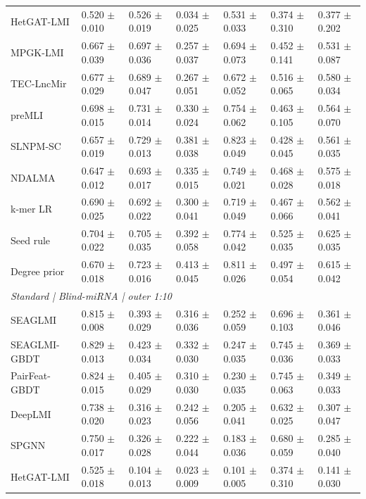 \begin{landscape}
{\begin{longtable}{lllllll}
HetGAT-LMI & 0.520 $\pm$ 0.010 & 0.526 $\pm$ 0.019 & 0.034 $\pm$ 0.025 & 0.531 $\pm$ 0.033 & 0.374 $\pm$ 0.310 & 0.377 $\pm$ 0.202 \\
MPGK-LMI & 0.667 $\pm$ 0.039 & 0.697 $\pm$ 0.036 & 0.257 $\pm$ 0.037 & 0.694 $\pm$ 0.073 & 0.452 $\pm$ 0.141 & 0.531 $\pm$ 0.087 \\
TEC-LncMir & 0.677 $\pm$ 0.029 & 0.689 $\pm$ 0.047 & 0.267 $\pm$ 0.051 & 0.672 $\pm$ 0.052 & 0.516 $\pm$ 0.065 & 0.580 $\pm$ 0.034 \\
preMLI & 0.698 $\pm$ 0.015 & 0.731 $\pm$ 0.014 & 0.330 $\pm$ 0.024 & 0.754 $\pm$ 0.062 & 0.463 $\pm$ 0.105 & 0.564 $\pm$ 0.070 \\
SLNPM-SC & 0.657 $\pm$ 0.019 & 0.729 $\pm$ 0.013 & 0.381 $\pm$ 0.038 & 0.823 $\pm$ 0.049 & 0.428 $\pm$ 0.045 & 0.561 $\pm$ 0.035 \\
NDALMA & 0.647 $\pm$ 0.012 & 0.693 $\pm$ 0.017 & 0.335 $\pm$ 0.015 & 0.749 $\pm$ 0.021 & 0.468 $\pm$ 0.028 & 0.575 $\pm$ 0.018 \\
k-mer LR & 0.690 $\pm$ 0.025 & 0.692 $\pm$ 0.022 & 0.300 $\pm$ 0.041 & 0.719 $\pm$ 0.049 & 0.467 $\pm$ 0.066 & 0.562 $\pm$ 0.041 \\
Seed rule & 0.704 $\pm$ 0.022 & 0.705 $\pm$ 0.035 & 0.392 $\pm$ 0.058 & 0.774 $\pm$ 0.042 & 0.525 $\pm$ 0.035 & 0.625 $\pm$ 0.035 \\
Degree prior & 0.670 $\pm$ 0.018 & 0.723 $\pm$ 0.016 & 0.413 $\pm$ 0.045 & 0.811 $\pm$ 0.026 & 0.497 $\pm$ 0.054 & 0.615 $\pm$ 0.042 \\
\multicolumn{7}{l}{\textit{Standard | Blind-miRNA | outer 1:10}}\\
SEAGLMI & 0.815 $\pm$ 0.008 & 0.393 $\pm$ 0.029 & 0.316 $\pm$ 0.036 & 0.252 $\pm$ 0.059 & 0.696 $\pm$ 0.103 & 0.361 $\pm$ 0.046 \\
SEAGLMI-GBDT & 0.829 $\pm$ 0.013 & 0.423 $\pm$ 0.034 & 0.332 $\pm$ 0.030 & 0.247 $\pm$ 0.035 & 0.745 $\pm$ 0.036 & 0.369 $\pm$ 0.033 \\
PairFeat-GBDT & 0.824 $\pm$ 0.015 & 0.405 $\pm$ 0.029 & 0.310 $\pm$ 0.030 & 0.230 $\pm$ 0.035 & 0.745 $\pm$ 0.063 & 0.349 $\pm$ 0.033 \\
DeepLMI & 0.738 $\pm$ 0.020 & 0.316 $\pm$ 0.023 & 0.242 $\pm$ 0.056 & 0.205 $\pm$ 0.041 & 0.632 $\pm$ 0.025 & 0.307 $\pm$ 0.047 \\
SPGNN & 0.750 $\pm$ 0.017 & 0.326 $\pm$ 0.028 & 0.222 $\pm$ 0.044 & 0.183 $\pm$ 0.036 & 0.680 $\pm$ 0.059 & 0.285 $\pm$ 0.040 \\
HetGAT-LMI & 0.525 $\pm$ 0.018 & 0.104 $\pm$ 0.013 & 0.023 $\pm$ 0.009 & 0.101 $\pm$ 0.005 & 0.374 $\pm$ 0.310 & 0.141 $\pm$ 0.030 \\

\end{longtable}}
\end{landscape}
